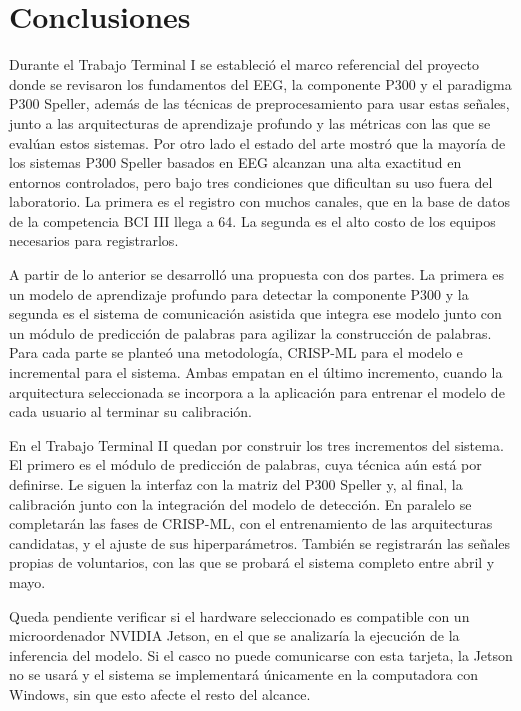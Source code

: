\chapter[CONCLUSIONES]{Conclusiones}
\label{cap:conclusiones}

Durante el Trabajo Terminal I se estableció el marco referencial del proyecto donde se revisaron los
fundamentos del EEG, la componente P300 y el paradigma P300 Speller, además de las técnicas de
preprocesamiento para usar estas señales, junto a las arquitecturas de aprendizaje profundo y las
métricas con las que se evalúan estos sistemas. Por otro lado el estado del arte mostró que la
mayoría de los sistemas P300 Speller basados en EEG alcanzan una alta exactitud en entornos
controlados, pero bajo tres condiciones que dificultan su uso fuera del laboratorio. La primera es
el registro con muchos canales, que en la base de datos de la competencia BCI III llega a 64. La
segunda es el alto costo de los equipos necesarios para registrarlos.

A partir de lo anterior se desarrolló una propuesta con dos partes. La primera es un modelo de
aprendizaje profundo para detectar la componente P300 y la segunda es el sistema de comunicación
asistida que integra ese modelo junto con un módulo de predicción de palabras para agilizar la
construcción de palabras. Para cada parte se planteó una metodología, CRISP-ML para el modelo e
incremental para el sistema. Ambas empatan en el último incremento, cuando la arquitectura
seleccionada se incorpora a la aplicación para entrenar el modelo de cada usuario al terminar su
calibración.

En el Trabajo Terminal II quedan por construir los tres incrementos del sistema. El primero es el
módulo de predicción de palabras, cuya técnica aún está por definirse. Le siguen la interfaz con la
matriz del P300 Speller y, al final, la calibración junto con la integración del modelo de
detección. En paralelo se completarán las fases de CRISP-ML, con el entrenamiento de las
arquitecturas candidatas, y el ajuste de sus hiperparámetros. También se registrarán las señales
propias de voluntarios, con las que se probará el sistema completo entre abril y mayo.

Queda pendiente verificar si el hardware seleccionado es compatible con un microordenador NVIDIA
Jetson, en el que se analizaría la ejecución de la inferencia del modelo. Si el casco no puede
comunicarse con esta tarjeta, la Jetson no se usará y el sistema se implementará únicamente en la
computadora con Windows, sin que esto afecte el resto del alcance.
